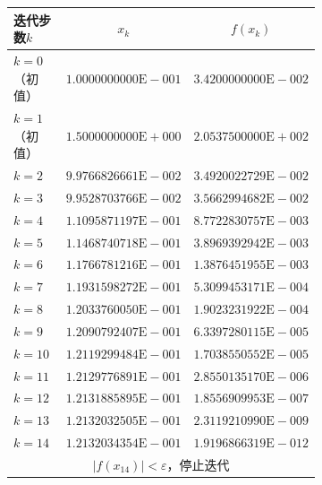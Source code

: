 \documentclass[11pt]{article}
\begin{document}
\begin{figure}
    \centering
    \begin{subfigure}{.65\textwidth}
        \centering
        \begin{tabular}{|l|c|c|}
            \hline
            迭代步数$k$            & $x_k$                        & $f(x_k)$                     \\
            \hline $k = 0$（初值） & $1.0000000000\text{E}{-}001$ & $3.4200000000\text{E}{-}002$ \\
            \hline $k = 1$（初值） & $1.5000000000\text{E}{+}000$ & $2.0537500000\text{E}{+}002$ \\
            \hline $k = 2$         & $9.9766826661\text{E}{-}002$ & $3.4920022729\text{E}{-}002$ \\
            \hline $k = 3$         & $9.9528703766\text{E}{-}002$ & $3.5662994682\text{E}{-}002$ \\
            \hline $k = 4$         & $1.1095871197\text{E}{-}001$ & $8.7722830757\text{E}{-}003$ \\
            \hline $k = 5$         & $1.1468740718\text{E}{-}001$ & $3.8969392942\text{E}{-}003$ \\
            \hline $k = 6$         & $1.1766781216\text{E}{-}001$ & $1.3876451955\text{E}{-}003$ \\
            \hline $k = 7$         & $1.1931598272\text{E}{-}001$ & $5.3099453171\text{E}{-}004$ \\
            \hline $k = 8$         & $1.2033760050\text{E}{-}001$ & $1.9023231922\text{E}{-}004$ \\
            \hline $k = 9$         & $1.2090792407\text{E}{-}001$ & $6.3397280115\text{E}{-}005$ \\
            \hline $k = 10$        & $1.2119299484\text{E}{-}001$ & $1.7038550552\text{E}{-}005$ \\
            \hline $k = 11$        & $1.2129776891\text{E}{-}001$ & $2.8550135170\text{E}{-}006$ \\
            \hline $k = 12$        & $1.2131885895\text{E}{-}001$ & $1.8556909953\text{E}{-}007$ \\
            \hline $k = 13$        & $1.2132032505\text{E}{-}001$ & $2.3119210990\text{E}{-}009$ \\
            \hline $k = 14$        & $1.2132034354\text{E}{-}001$ & $1.9196866319\text{E}{-}012$ \\
            \hline \multicolumn{3}{|c|}{$|f(x_{14})| < \varepsilon$，停止迭代}                   \\

\end{tabular}
\end{subfigure}
\end{figure}
\end{document}
